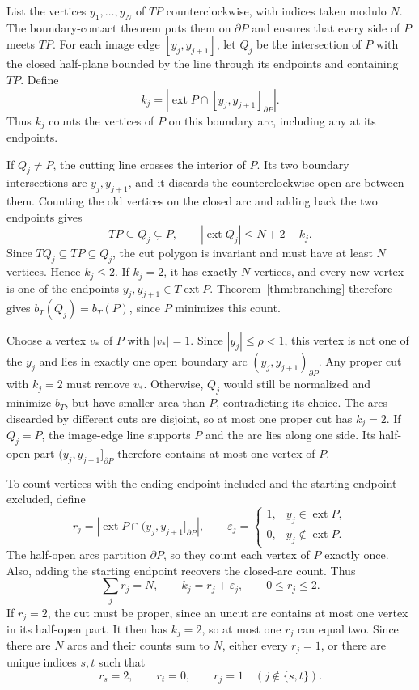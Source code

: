 \documentclass[11pt,a4paper]{article}
\DeclareMathOperator{\ext}{ext}
\theoremstyle{definition}
\theoremstyle{remark}
\numberwithin{equation}{section}
\begin{document}
List the vertices $y_1,\ldots,y_N$ of $TP$ counterclockwise, with indices taken modulo $N$. The boundary-contact theorem puts them on $\partial P$ and ensures that every side of $P$ meets $TP$. For each image edge $[y_j,y_{j+1}]$, let $Q_j$ be the intersection of $P$ with the closed half-plane bounded by the line through its endpoints and containing $TP$. Define
\[
 k_j=|\ext P\cap[y_j,y_{j+1}]_{\partial P}|.
\]
Thus $k_j$ counts the vertices of $P$ on this boundary arc, including any at its endpoints.

If $Q_j\ne P$, the cutting line crosses the interior of $P$. Its two boundary intersections are $y_j,y_{j+1}$, and it discards the counterclockwise open arc between them. Counting the old vertices on the closed arc and adding back the two endpoints gives
\[
 TP\subseteq Q_j\subsetneq P,\qquad
 |\ext Q_j|\le N+2-k_j.
\]
Since $TQ_j\subseteq TP\subseteq Q_j$, the cut polygon is invariant and must have at least $N$ vertices. Hence $k_j\le2$. If $k_j=2$, it has exactly $N$ vertices, and every new vertex is one of the endpoints $y_j,y_{j+1}\in T\ext P$. Theorem~\ref{thm:branching} therefore gives $b_T(Q_j)=b_T(P)$, since $P$ minimizes this count.

Choose a vertex $v_*$ of $P$ with $|v_*|=1$. Since $|y_j|\le\rho<1$, this vertex is not one of the $y_j$ and lies in exactly one open boundary arc $(y_j,y_{j+1})_{\partial P}$. Any proper cut with $k_j=2$ must remove $v_*$. Otherwise, $Q_j$ would still be normalized and minimize $b_T$, but have smaller area than $P$, contradicting its choice. The arcs discarded by different cuts are disjoint, so at most one proper cut has $k_j=2$. If $Q_j=P$, the image-edge line supports $P$ and the arc lies along one side. Its half-open part $(y_j,y_{j+1}]_{\partial P}$ therefore contains at most one vertex of $P$.

To count vertices with the ending endpoint included and the starting endpoint excluded, define
\[
 r_j=|\ext P\cap(y_j,y_{j+1}]_{\partial P}|,
 \qquad
 \varepsilon_j=
 \begin{cases}
  1,&y_j\in\ext P,\\
  0,&y_j\notin\ext P.
 \end{cases}
\]
The half-open arcs partition $\partial P$, so they count each vertex of $P$ exactly once. Also, adding the starting endpoint recovers the closed-arc count. Thus
\[
 \sum_j r_j=N,\qquad k_j=r_j+\varepsilon_j,\qquad 0\le r_j\le2.
\]
If $r_j=2$, the cut must be proper, since an uncut arc contains at most one vertex in its half-open part. It then has $k_j=2$, so at most one $r_j$ can equal two. Since there are $N$ arcs and their counts sum to $N$, either every $r_j=1$, or there are unique indices $s,t$ such that
\[
 r_s=2,\qquad r_t=0,\qquad r_j=1\quad(j\notin\{s,t\}).
\]
\end{document}
